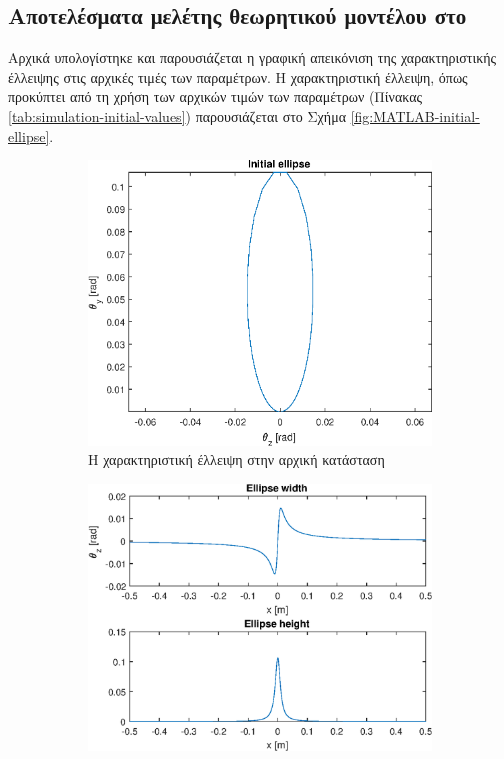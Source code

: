 \subsection{Αποτελέσματα μελέτης θεωρητικού μοντέλου στο }

Αρχικά υπολογίστηκε και παρουσιάζεται η γραφική απεικόνιση της χαρακτηριστικής έλλειψης στις αρχικές τιμές των παραμέτρων.
Η χαρακτηριστική έλλειψη, όπως προκύπτει από τη χρήση των αρχικών τιμών των παραμέτρων (Πίνακας \ref{tab:simulation-initial-values}) παρουσιάζεται στο Σχήμα \ref{fig:MATLAB-initial-ellipse}.

\begin{figure}[tph]	
	\begin{subfigure}{0.47\textwidth}
		\includegraphics[width=\linewidth]{figures/MATLAB-variable-analysis/initial-ellipse}
		\centering
		\caption{Η χαρακτηριστική έλλειψη στην αρχική κατάσταση}
		\label{fig:MATLAB-variable-analysis-initial-ellipse}
	\end{subfigure}
	\hfill
	\begin{subfigure}{0.47\textwidth}
		\includegraphics[width=\linewidth]{figures/MATLAB-variable-analysis/initial-ellipse-height-width}

\end{subfigure}
\end{figure}
